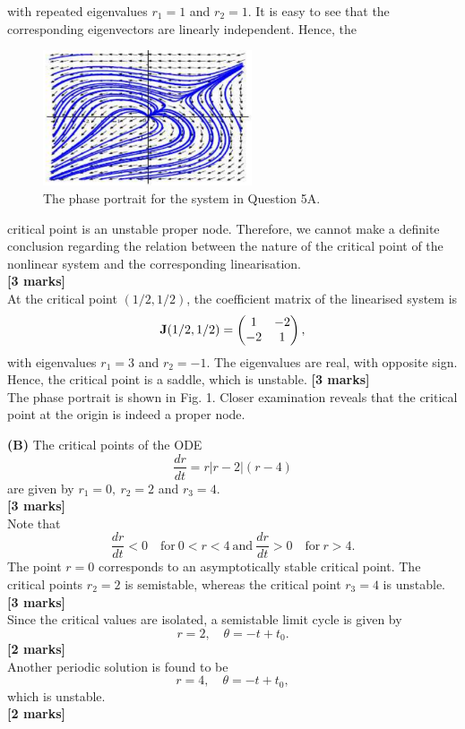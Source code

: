 \documentclass[11pt,a4paper]{article}
\begin{document}
\begin{enumerate}
$$		$$
		with repeated eigenvalues $r_1 = 1$ and $r_2 = 1$. It is easy to see that the corresponding eigenvectors are linearly independent. Hence, the
		\begin{figure}[H]
			\centering
			\includegraphics[width=0.55\textwidth]{figure/2_fig1.PNG}
			\caption{The phase portrait for the system in Question 5A.}
		\end{figure}
		critical point is an unstable proper node. Therefore, we cannot make a definite conclusion regarding the relation between the nature of the critical point of the nonlinear system and the corresponding linearisation.\\
		\hspace*{0pt}\hfill\textbf{[3 marks]}\\
		At the critical point $(1/2, 1/2)$, the coefficient matrix of the linearised system is
		$$
		\vb{J}(1/2, 1/2) =
		\begin{pmatrix}
			1 & -2\\
			-2 & 1
		\end{pmatrix},
		$$
		with eigenvalues $r_1 = 3$ and $r_2 = −1$. The eigenvalues are real, with opposite sign. Hence, the critical point is a saddle, which is unstable.
		\hspace*{0pt}\hfill\textbf{[3 marks]}\\
		The phase portrait is shown in Fig. 1. Closer examination reveals that the critical point at the origin is indeed a proper node.\par
		\textbf{(B)} The critical points of the ODE
		$$
		\frac{dr}{dt} = r|r-2|(r-4)
		$$
		are given by $r_1 = 0,\ r_2 = 2$ and $r_3 = 4$.\\
		\hspace*{0pt}\hfill\textbf{[3 marks]}\\
		Note that
		$$
		\frac{dr}{dt} < 0\quad \text{for}\ 0 < r < 4\ \text{and}\ \frac{dr}{dt} > 0\quad \text{for}\ r > 4.
		$$
		The point $r = 0$ corresponds to an asymptotically stable critical point. The critical points $r_2 = 2$ is semistable, whereas the critical point $r_3 = 4$ is unstable.\\
		\hspace*{0pt}\hfill\textbf{[3 marks]}\\
		Since the critical values are isolated, a semistable limit cycle is given by
		$$
		r = 2, \quad \theta = -t + t_0.
		$$
		\hfill\textbf{[2 marks]}\\
		Another periodic solution is found to be
		$$
		r = 4, \quad \theta = -t + t_0,
		$$
		which is unstable.\\
		\hspace*{0pt}\hfill\textbf{[2 marks]}
\end{enumerate}
\end{document}
